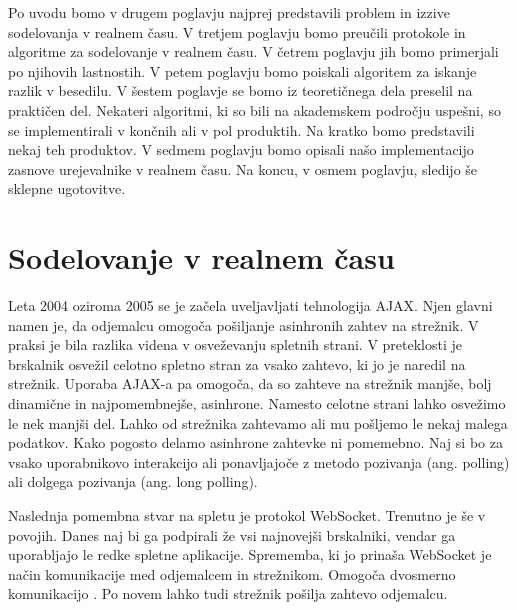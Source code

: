 \documentclass[a4paper, 12pt, twoside]{book}
\begin{document}
Po uvodu bomo v drugem poglavju najprej predstavili problem in izzive sodelovanja v realnem času. V tretjem poglavju bomo preučili protokole in algoritme za sodelovanje v realnem času. V četrem poglavju jih bomo primerjali po njihovih lastnostih. V petem poglavju bomo poiskali algoritem za iskanje razlik v besedilu. V šestem poglavje se bomo iz teoretičnega dela preselil na praktičen del. Nekateri algoritmi, ki so bili na akademskem področju uspešni, so se implementirali v končnih ali v pol produktih. Na kratko bomo predstavili nekaj teh produktov. V sedmem poglavju bomo opisali našo implementacijo zasnove urejevalnike v realnem času. Na koncu, v osmem poglavju, sledijo še sklepne ugotovitve.

\chapter{Sodelovanje v realnem času}

Leta 2004 oziroma 2005 se je začela uveljavljati tehnologija AJAX. Njen glavni namen je, da odjemalcu omogoča pošiljanje asinhronih zahtev na strežnik. V praksi je bila razlika videna v osveževanju spletnih strani. V preteklosti je brskalnik osvežil celotno spletno stran za vsako zahtevo, ki jo je naredil na strežnik. Uporaba AJAX-a pa omogoča, da so zahteve na strežnik manjše, bolj dinamične in najpomembnejše, asinhrone. Namesto celotne strani lahko osvežimo le nek manjši del. Lahko od strežnika zahtevamo ali mu pošljemo le nekaj malega podatkov. Kako pogosto delamo asinhrone zahtevke ni pomemebno. Naj si bo za vsako uporabnikovo interakcijo ali ponavljajoče z metodo pozivanja (ang. polling) \cite{diffsync} ali dolgega pozivanja (ang. long polling).

Naslednja pomembna stvar na spletu je protokol WebSocket. Trenutno je še v povojih. Danes naj bi ga podpirali že vsi najnovejši brskalniki, vendar ga uporabljajo le redke spletne aplikacije. Sprememba, ki jo prinaša WebSocket je način komunikacije med odjemalcem in strežnikom. Omogoča dvosmerno komunikacijo \cite{wave-cs}. Po novem lahko tudi strežnik pošilja zahtevo odjemalcu.
\end{document}

